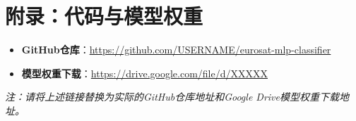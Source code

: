 \documentclass[12pt,a4paper]{article}
\begin{document}
\section*{附录：代码与模型权重}

\begin{itemize}[leftmargin=2em]
    \item \textbf{GitHub仓库}：\url{https://github.com/USERNAME/eurosat-mlp-classifier}
    \item \textbf{模型权重下载}：\url{https://drive.google.com/file/d/XXXXX}
\end{itemize}

\vspace{1em}
\noindent\textit{注：请将上述链接替换为实际的GitHub仓库地址和Google Drive模型权重下载地址。}
\end{document}
